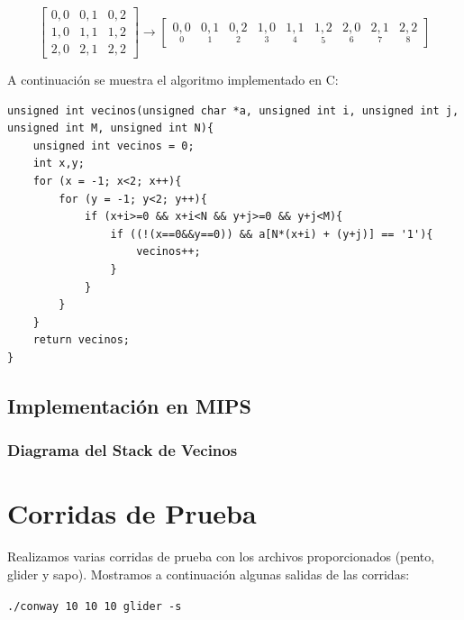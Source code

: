 \documentclass[11pt,a4paper]{article}
\begin{document}
\begin{equation*}
\begin{bmatrix}
0,0 & 0,1 & 0,2 \\
1,0 & 1,1 & 1,2 \\
2,0 & 2,1 & 2,2
\end{bmatrix}
\rightarrow 
\begin{bmatrix}
\underset{0}{0,0} & \underset{1}{0,1} & \underset{2}{0,2} & \underset{3}{1,0} & \underset{4}{1,1} & \underset{5}{1,2} & \underset{6}{2,0} & \underset{7}{2,1} & \underset{8}{2,2}
\end{bmatrix}
\end{equation*}

A continuación se muestra el algoritmo implementado en C:

\begin{lstlisting}[caption={Código de la funcion vecinos},label={lst:codigoc}]
unsigned int vecinos(unsigned char *a, unsigned int i, unsigned int j, unsigned int M, unsigned int N){
	unsigned int vecinos = 0;
	int x,y;
	for (x = -1; x<2; x++){
		for (y = -1; y<2; y++){
			if (x+i>=0 && x+i<N && y+j>=0 && y+j<M){
				if ((!(x==0&&y==0)) && a[N*(x+i) + (y+j)] == '1'){
					vecinos++;
				}
			}
		}
	}
	return vecinos;
}
\end{lstlisting}

\subsection{Implementación en MIPS}

\subsubsection{Diagrama del Stack de Vecinos}

\section{Corridas de Prueba}
Realizamos varias corridas de prueba con los archivos proporcionados (pento, glider y sapo). Mostramos a continuación algunas salidas de las corridas:

\texttt{./conway 10 10 10 glider -s}
\end{document}
